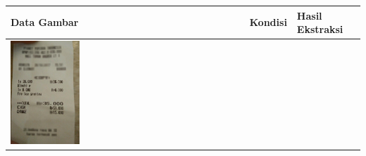 \begin{table}[htbp]
    \centering
    \begin{tabularx}{\textwidth}{|p{4.2cm}|X|X|}
        \hline
        \textbf{Data Gambar} & \textbf{Kondisi} & \textbf{Hasil Ekstraksi}\\ \hline
        \includegraphics[width=0.3\textwidth]{images/contoh-data/struk-4.jpg} & 
         & 
         \\ \hline
    \end{tabularx}
\end{table}